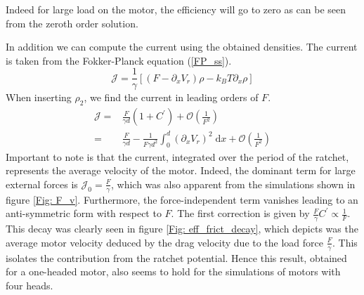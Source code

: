 \documentclass[aps,pre,twocolumn,showpacs,showkeys,a4paper]{revtex4}
\newcommand{\rmd}{{\mathrm d}}
\begin{document}
Indeed for large load on the motor, the efficiency will go to zero as can be seen from the zeroth order solution.
\par
In addition we can compute the current using the obtained densities. 
The current is taken from the Fokker-Planck equation (\ref{FP_ss}).
\begin{equation}
\mathcal{J} = \frac{1}{\gamma} \left[ \left( F - \partial_x V_r \right) \rho - k_B T \partial_x \rho \right] 
\end{equation}
When inserting $\rho_2$, we find the current in leading orders of $F$.
\begin{align*}
\mathcal{J} =& \frac{F}{\gamma d} \left( 1 + C^\prime \right) + \mathcal{O}( \frac{1}{F^2} ) \\
=& \frac{F}{\gamma d} - \frac{1}{F\gamma d^2} \int^d_0 \left( \partial_x V_r \right)^2 \; \rmd x + \mathcal{O}(\frac{1}{F^2}) 
\end{align*}
Important to note is that the current, integrated over the period of the ratchet, represents the average velocity of the motor. 
Indeed, the dominant term for large external forces is $\mathcal{J}_0 = \frac{F}{\gamma}$, which was also apparent from the simulations shown in figure \ref{Fig: F_v}. 
Furthermore, the force-independent term vanishes leading to an anti-symmetric form with respect to $F$. 
The first correction is given by $\frac{F}{\gamma}C^\prime\propto \frac{1}{F}$. 
This decay was clearly seen in figure \ref{Fig: eff_frict_decay}, which depicts was the average motor velocity deduced by the drag velocity due to the load force $\frac{F}{\gamma}$. 
This isolates the contribution from the ratchet potential. 
Hence this result, obtained for a one-headed motor, also seems to hold for the simulations of motors with four heads. 
\end{document}
